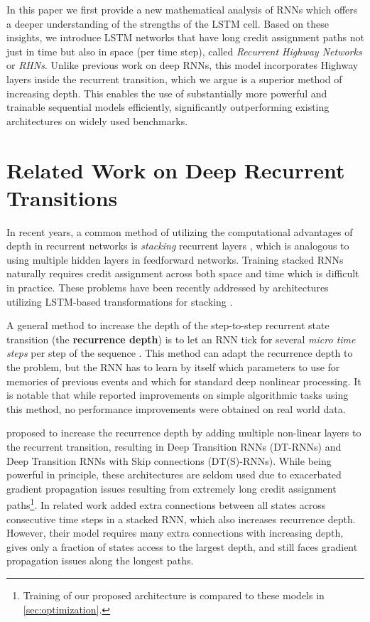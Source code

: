 \documentclass[letterpaper]{article}
\def\Arch{Recurrent Highway Network} \def\arch{RHN}
\begin{document}
In this paper we first provide a new mathematical analysis of RNNs which offers a deeper understanding of the strengths of the LSTM cell.
Based on these insights, we introduce LSTM networks that have long credit assignment paths not just in time but also in space (per time step), called \emph{\Arch{}s} or \emph{\arch{}s}.
Unlike previous work on deep RNNs, this model incorporates Highway layers inside the recurrent transition, which we argue is a superior method of increasing depth.
This enables the use of substantially more powerful and trainable sequential models efficiently, significantly outperforming existing architectures on widely used benchmarks.

\section{Related Work on Deep Recurrent Transitions}
\label{sec:related}


In recent years, a common method of utilizing the computational advantages of depth in recurrent networks is \emph{stacking} recurrent layers \citep{schmidhuber1992learning}, which is analogous to using multiple hidden layers in feedforward networks.
Training stacked RNNs naturally requires credit assignment across both space and time which is difficult in practice.
These problems have been recently addressed by architectures utilizing LSTM-based transformations for stacking \citep{zhang2016highway,grid_lstm}.

A general method to increase the depth of the step-to-step recurrent state transition (the \textbf{recurrence depth}) is to let an RNN tick for several \emph{micro time steps} per step of the sequence \citep{schmidhuber_ticks,srivastava2013first,graves_ticks}.
This method can adapt the recurrence depth to the problem, but the RNN has to learn by itself which parameters to use for memories of previous events and which for standard deep nonlinear processing. 
It is notable that while \citet{graves_ticks} reported improvements on simple algorithmic tasks using this method, no performance improvements were obtained on real world data.

\citet{pascanu} proposed to increase the recurrence depth by adding multiple non-linear layers to the recurrent transition, resulting in Deep Transition RNNs (DT-RNNs) and Deep Transition RNNs with Skip connections (DT(S)-RNNs).
While being powerful in principle, these architectures are seldom used due to exacerbated gradient propagation issues resulting from extremely long credit assignment paths\footnote{Training of our proposed architecture is compared to these models in \autoref{sec:optimization}.}.
In related work \citet{gated_feedback_rnn} added extra connections between all states across consecutive time steps in a stacked RNN, which also increases recurrence depth.
However, their model requires many extra connections with increasing depth, gives only a fraction of states access to the largest depth, and still faces gradient propagation issues along the longest paths.
\end{document}
